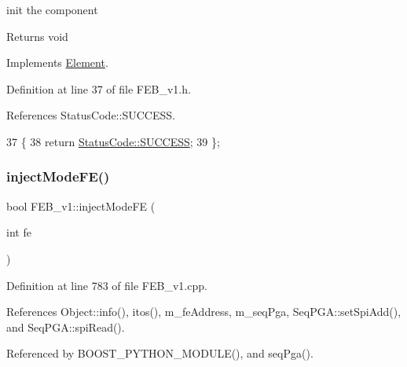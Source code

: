 init the component

\begin{DoxyReturn}{Returns}
void 
\end{DoxyReturn}


Implements \hyperlink{classElement_af42754b5cabc198869222725218d695c}{Element}.



Definition at line 37 of file F\+E\+B\+\_\+v1.\+h.



References Status\+Code\+::\+S\+U\+C\+C\+E\+SS.


\begin{DoxyCode}
37                     \{
38     \textcolor{keywordflow}{return} \hyperlink{classStatusCode_a6f565cbeadc76d14c72f047e5e85eb4badd0da38d3ba0d922efd1f4619bc37ad8}{StatusCode::SUCCESS};
39   \};
\end{DoxyCode}
\mbox{\label{classFEB__v1_adad5a9a1dc8f650a59e6edb310451cab}} 
\subsubsection{\texorpdfstring{inject\+Mode\+F\+E()}{injectModeFE()}}
{\footnotesize\ttfamily bool F\+E\+B\+\_\+v1\+::inject\+Mode\+FE (\begin{DoxyParamCaption}\item[{int}]{fe }\end{DoxyParamCaption})}



Definition at line 783 of file F\+E\+B\+\_\+v1.\+cpp.



References Object\+::info(), itos(), m\+\_\+fe\+Address, m\+\_\+seq\+Pga, Seq\+P\+G\+A\+::set\+Spi\+Add(), and Seq\+P\+G\+A\+::spi\+Read().



Referenced by B\+O\+O\+S\+T\+\_\+\+P\+Y\+T\+H\+O\+N\+\_\+\+M\+O\+D\+U\+L\+E(), and seq\+Pga().


